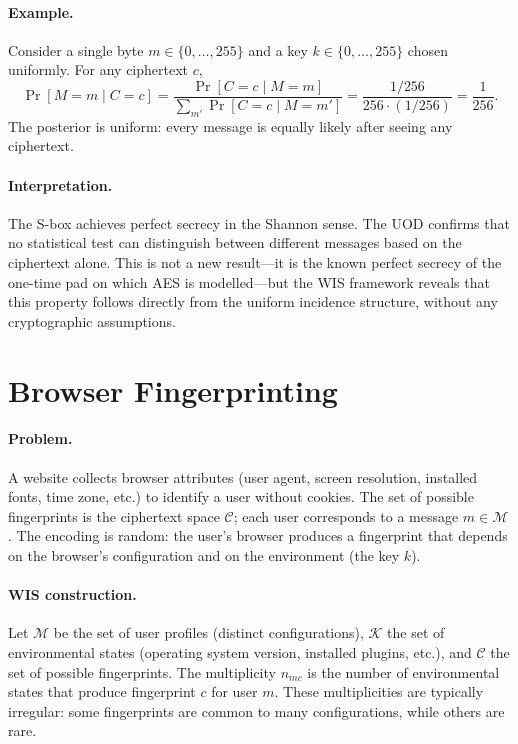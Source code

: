 \paragraph{Example.}
Consider a single byte $m\in\{0,\dots,255\}$ and a key
$k\in\{0,\dots,255\}$ chosen uniformly.  For any ciphertext $c$,
\[
\Pr[M=m\mid C=c] = \frac{\Pr[C=c\mid M=m]}{\sum_{m'}\Pr[C=c\mid M=m']}
= \frac{1/256}{256\cdot(1/256)} = \frac{1}{256}.
\]
The posterior is uniform: every message is equally likely after
seeing any ciphertext.

\paragraph{Interpretation.}
The S-box achieves perfect secrecy in the Shannon sense.  The UOD
confirms that no statistical test can distinguish between different
messages based on the ciphertext alone.  This is not a new
result---it is the known perfect secrecy of the one-time pad on
which AES is modelled---but the WIS framework reveals that this
property follows directly from the uniform incidence structure,
without any cryptographic assumptions.

\section{Browser Fingerprinting}\label{ch:sec:browser-fp}
\label{sec:app-fingerprinting}

\paragraph{Problem.}
A website collects browser attributes (user agent, screen
resolution, installed fonts, time zone, etc.) to identify a user
without cookies.  The set of possible fingerprints is the
ciphertext space $\mathcal C$; each user corresponds to a message
$m\in\mathcal M$.  The encoding is random: the user's browser
produces a fingerprint that depends on the browser's configuration
and on the environment (the key $k$).

\paragraph{WIS construction.}
Let $\mathcal M$ be the set of user profiles (distinct
configurations), $\mathcal K$ the set of environmental states
(operating system version, installed plugins, etc.), and
$\mathcal C$ the set of possible fingerprints.  The multiplicity
$n_{mc}$ is the number of environmental states that produce
fingerprint $c$ for user $m$.  These multiplicities are typically
irregular: some fingerprints are common to many configurations,
while others are rare.

